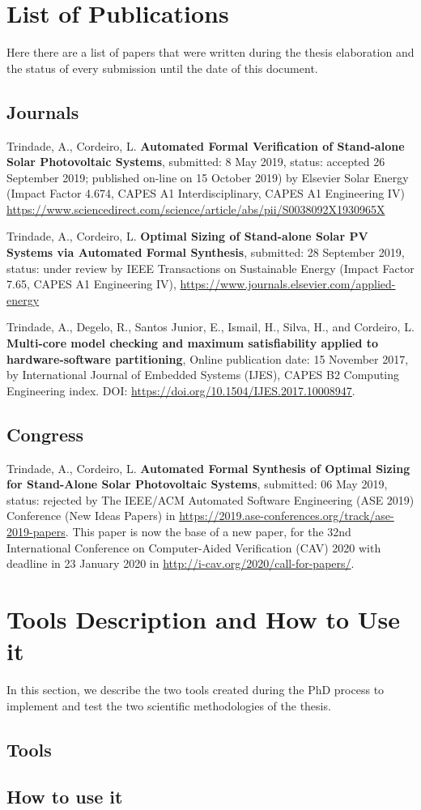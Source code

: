 %
\section{List of Publications}
Here there are a list of papers that were written during the thesis elaboration and the status of every submission until the date of this document.

\subsection{Journals}

Trindade, A., Cordeiro, L. \textbf{Automated Formal Verification of Stand-alone Solar Photovoltaic Systems}, submitted: 8 May 2019, status: accepted 26 September 2019; published on-line on 15 October 2019) by Elsevier Solar Energy (Impact Factor 4.674, CAPES A1 Interdisciplinary, CAPES A1 Engineering IV) \url{https://www.sciencedirect.com/science/article/abs/pii/S0038092X1930965X}

Trindade, A., Cordeiro, L. \textbf{Optimal Sizing of Stand-alone Solar PV Systems via Automated Formal Synthesis}, submitted: 28 September 2019, status: under review by IEEE Transactions on Sustainable Energy (Impact Factor 7.65, CAPES A1 Engineering IV), \url{https://www.journals.elsevier.com/applied-energy}

Trindade, A., Degelo, R., Santos Junior, E., Ismail, H., Silva, H., and Cordeiro, L. \textbf{Multi-core model checking and maximum satisfiability applied to hardware-software partitioning}, Online publication date: 15 November 2017, by International Journal of Embedded Systems (IJES), CAPES B2 Computing Engineering index. DOI:   \url {https://doi.org/10.1504/IJES.2017.10008947}.


\subsection{Congress}
Trindade, A., Cordeiro, L. \textbf{Automated Formal Synthesis of Optimal Sizing for Stand-Alone Solar Photovoltaic Systems}, submitted: 06 May 2019, status: rejected by The IEEE/ACM Automated Software Engineering (ASE 2019) Conference (New Ideas Papers) in \url{https://2019.ase-conferences.org/track/ase-2019-papers}. This paper is now the base of a new paper, for the 32nd International Conference on Computer-Aided Verification (CAV) 2020 with deadline in 23 January 2020 in \url{http://i-cav.org/2020/call-for-papers/}.

\section{Tools Description and How to Use it}

In this section, we describe the two tools created during the PhD process to implement and test the two scientific methodologies of the thesis.

\subsection{Tools}

\subsection{How to use it}


